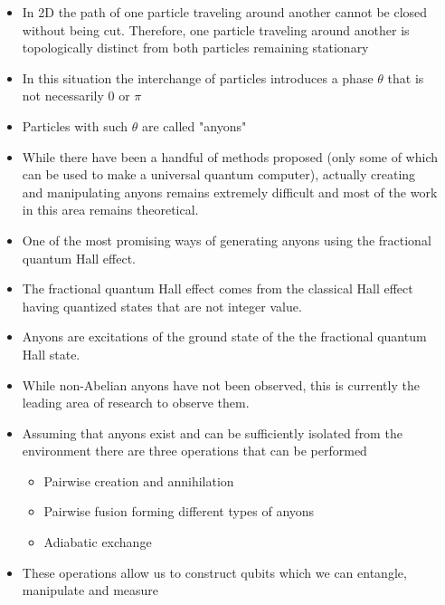 \documentclass[20pt,,margin=1in,innermargin=-4.5in,blockverticalspace=-0.25in]{tikzposter}
\begin{document}
\begin{columns}
{\begin{tikzfigure}
        \end{tikzfigure}
        \begin{itemize}
            \item In 2D the path of one particle traveling around another cannot be closed without being cut. Therefore, one particle traveling around another is topologically distinct from both particles remaining stationary
             \item In this situation the interchange of particles introduces a phase $\theta$ that is not necessarily $0$ or $\pi$
             \item Particles with such $\theta$ are called "anyons"
             \item While there have been a handful of methods proposed (only some of which can be used to make a universal quantum computer), actually creating and manipulating anyons remains extremely difficult and most of the work in this area remains theoretical.
             \item One of the most promising ways of generating anyons using the fractional quantum Hall effect.
             \item The fractional quantum Hall effect comes from the classical Hall effect having quantized states that are not integer value.
             \item Anyons are excitations of the ground state of the the fractional quantum Hall state.
             \item While non-Abelian anyons have not been observed, this is currently the leading area of research to observe them.
             \item Assuming that anyons exist and can be sufficiently isolated from the environment there are three operations that can be performed \cite{cite:1}
             \begin{itemize}
                 \item Pairwise creation and annihilation
                 \item Pairwise fusion forming different types of anyons
                 \item Adiabatic exchange
             \end{itemize}
             \item These operations allow us to construct qubits which we can entangle, manipulate and measure
         \end{itemize}
    }
   
\end{columns}
\end{document}

